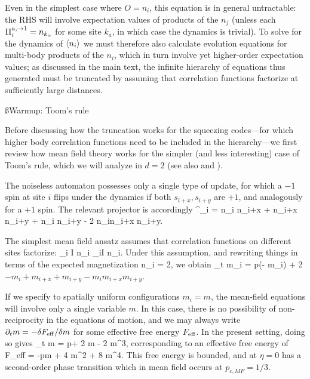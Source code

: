\documentclass[pra,aps,twocolumn,groupedaddress,superscriptaddress,nofootinbib,preprintnumbers]{revtex4-2}
\begin{document}
\begin{widetext}
		Even in the simplest case where $O = n_i$, this equation is in general untractable: the RHS will involve expectation values of products of the $n_j$ (unless each $\Pi^{a,\rightarrow1}_i = n_{k_\alpha}$ for some site $k_a$, in which case the dynamics is trivial). To solve for the dynamics of $\langle n_i\rangle$ we must therefore also calculate evolution equations for multi-body products of the $n_i$, which in turn involve yet higher-order expectation values; as discussed in the main text, the infinite hierarchy of equations thus generated must be truncated by assuming that correlation functions factorize at sufficiently large distances. 
		
		
		
		\ss{Warmup: Toom's rule} \label{app:toom_mf}
		
		Before discussing how the truncation works for the squeezing codes---for which higher body correlation functions need to be included in the hierarchy---we first review how mean field theory works for the simpler (and less interesting) case of Toom's rule, which we will analyze in $d=2$ (see also \cite{bennett1985role} and \cite{lebowitz1990statistical}).
		
		The noiseless automaton possesses only a single type of update, for which a $-1$ spin at site $i$ flips under the dynamics if both $s_{i+x}, s_{i+y}$ are $+1$, and analogously for a $+1$ spin. The relevant projector is accordingly 
		\be \Pi^{}_i = n_i n_{i+x} + n_{i+x} n_{i+y} + n_i n_{i+y} - 2 n_in_{i+x} n_{i+y}.\ee 
		
		The simplest mean field ansatz assumes that correlation functions on different sites factorize: 
		\be \left\lan \prod_{i \in I} n_i \right\ran \ra \prod_{i\in I} \lan n_i\ran.\ee 
		Under this assumption, and rewriting things in terms of the expected magnetization 
		\be \lan n_i \ran = 2,\ee 
		we obtain 
		\be \p_t m_i = p(\eta - m_i) + 2\(-m_i + m_{i+x} + m_{i+y} - m_i m_{i+x}m_{i+y}\).\ee 
		
		If we specify to spatially uniform configurations $m_i = m$, the mean-field equations will involve only a single variable $m$. In this case, there is no possibility of non-reciprocity in the equations of motion, and we may always write $\partial_t m = -\delta F_{\rm eff} / \delta m$ for some effective free energy $F_{\rm eff}$. In the present setting, doing so gives 
		\be \p_t m = p\eta + 2 m - 2 m^3,\ee 
		corresponding to an effective free energy of 
		\be F_{\rm eff} = -p\eta m + 4 m^2 + 8 m^4.\ee 
		This free energy is bounded, and at $\eta=0$ has a second-order phase transition which in mean field occurs at $p_{c,MF} = 1/3$. 
		

\end{widetext}
\end{document}
